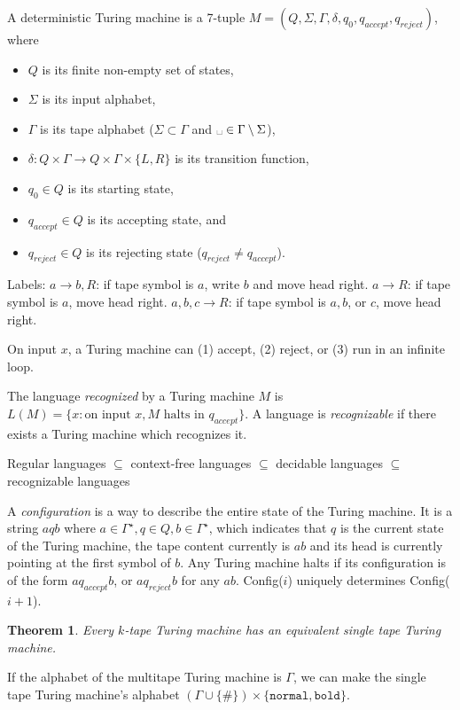 \documentclass[letterpaper,landscape,11pt]{article}
\newtheorem{theorem}{Theorem}
\begin{document}
A deterministic Turing machine is a 7-tuple $M = (Q, \Sigma, \Gamma, \delta, q_0, q_{accept}, q_{reject})$, where
\begin{itemize}
	\item $Q$ is its finite non-empty set of states,
	\item $\Sigma$ is its input alphabet,
	\item $\Gamma$ is its tape alphabet ($\Sigma \subset \Gamma$ and $\text{\textvisiblespace } \in \Gamma \setminus \Sigma$),
	\item $\delta : Q \times \Gamma \rightarrow Q \times \Gamma \times \{L, R\}$ is its transition function,
	\item $q_0 \in Q$ is its starting state,
	\item $q_{accept} \in Q$ is its accepting state, and
	\item $q_{reject} \in Q$ is its rejecting state ($q_{reject} \neq q_{accept}$).
\end{itemize}

Labels: $a \rightarrow b, R$: if tape symbol is $a$, write $b$ and move head right. $a \rightarrow R$: if tape symbol is $a$, move head right. $a, b, c \rightarrow R$: if tape symbol is $a, b$, or $c$, move head right.

On input $x$, a Turing machine can (1) accept, (2) reject, or (3) run in an infinite loop.

The language \emph{recognized} by a Turing machine $M$ is $L(M) = \{x : \text{on input } x, M \text{ halts in } q_{accept}\}$. A language is \emph{recognizable} if there exists a Turing machine which recognizes it.

Regular languages $\subseteq$ context-free languages $\subseteq$ decidable languages $\subseteq$ recognizable languages

A \emph{configuration} is a way to describe the entire state of the Turing machine. It is a string $aqb$ where $a \in \Gamma^\star, q \in Q, b \in \Gamma^\star$, which indicates that $q$ is the current state of the Turing machine, the tape content currently is $ab$ and its head is currently pointing at the first symbol of $b$. Any Turing machine halts if its configuration is of the form $aq_{accept}b$, or $aq_{reject}b$ for any $ab$. Config($i$) uniquely determines Config($i + 1$).

\begin{theorem}
	Every $k$-tape Turing machine has an equivalent single tape Turing machine.
\end{theorem}
If the alphabet of the multitape Turing machine is $\Gamma$, we can make the single tape Turing machine's alphabet $(\Gamma \cup \{\#\}) \times \{\texttt{normal}, \texttt{bold}\}$.
\end{document}
